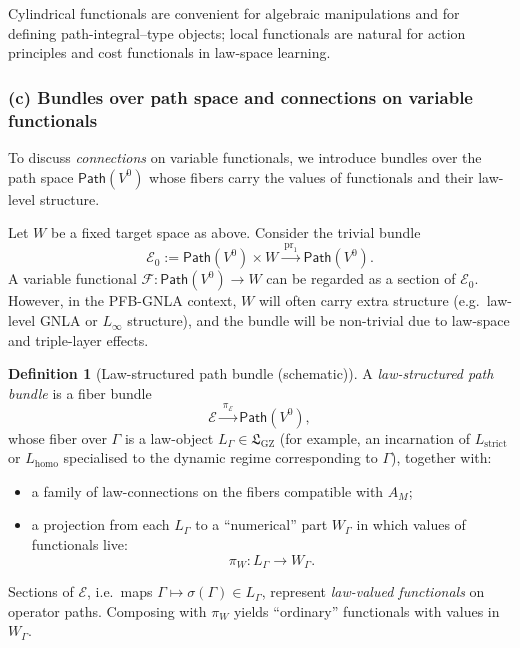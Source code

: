 \documentclass[11pt]{book}
\theoremstyle{plain}
\theoremstyle{definition}
\newtheorem{definition}[theorem]{Definition} \theoremstyle{remark}
\newcommand{\GZLS}{\ensuremath{\mathfrak{L}_{\mathrm{GZ}}}}       \newcommand{\GZLT}{\ensuremath{M_{!w}}}                           \newcommand{\GZLOC}{\ensuremath{A_M}}                             \newcommand{\GZLCurv}{\ensuremath{\mathcal{F}_{\mathrm{law}}}}
\begin{document}
Cylindrical functionals are convenient for algebraic manipulations and
for defining path-integral–type objects; local functionals are natural
for action principles and cost functionals in law-space learning.



\subsubsection*{(c) Bundles over path space and connections on variable functionals}

To discuss \emph{connections} on variable functionals, we introduce
bundles over the path space $\mathsf{Path}(V^0)$ whose fibers carry the
values of functionals and their law-level structure.

Let $W$ be a fixed target space as above. Consider the trivial bundle
\[
   \mathcal{E}_0
   :=
   \mathsf{Path}(V^0)\times W
   \xrightarrow{\ \mathrm{pr}_1\ }
   \mathsf{Path}(V^0).
\]
A variable functional $\mathcal{F}:\mathsf{Path}(V^0)\to W$ can be
regarded as a section of $\mathcal{E}_0$. However, in the PFB-GNLA
context, $W$ will often carry extra structure (e.g.\ law-level GNLA or
$L_\infty$ structure), and the bundle will be non-trivial due to
law-space and triple-layer effects.

\begin{definition}[Law-structured path bundle (schematic)]
A \emph{law-structured path bundle} is a fiber bundle
  \[
     \mathcal{E}
     \xrightarrow{\ \pi_{\mathcal{E}}\ }
     \mathsf{Path}(V^0),
  \]
  whose fiber over $\Gamma$ is a law-object
  $L_\Gamma\in\GZLS$ (for example, an incarnation of
  $L_{\mathrm{strict}}$ or $L_{\mathrm{homo}}$ specialised to the
  dynamic regime corresponding to $\Gamma$), together with:
  \begin{itemize}
    \item a family of law-connections on the fibers compatible with
          \GZLOC;
    \item a projection from each $L_\Gamma$ to a “numerical” part
          $W_\Gamma$ in which values of functionals live:
          \[
             \pi_W:L_\Gamma\to W_\Gamma.
          \]
  \end{itemize}
\end{definition}

Sections of $\mathcal{E}$, i.e.\ maps $\Gamma\mapsto\sigma(\Gamma)\in
L_\Gamma$, represent \emph{law-valued functionals} on operator paths.
Composing with $\pi_W$ yields “ordinary” functionals with values in
$W_\Gamma$.
\end{document}
